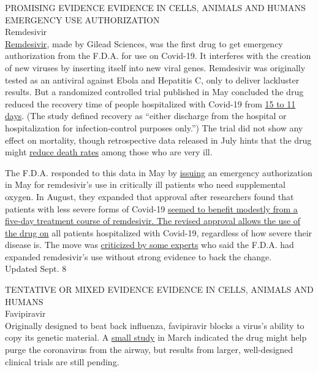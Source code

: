 PROMISING EVIDENCE EVIDENCE IN CELLS, ANIMALS AND HUMANS EMERGENCY USE
AUTHORIZATION\\
Remdesivir\\
\href{https://www.nytimes3xbfgragh.onion/2020/05/23/health/coronavirus-remdesivir.html}{Remdesivir},
made by Gilead Sciences, was the first drug to get emergency
authorization from the F.D.A. for use on Covid-19. It interferes with
the creation of new viruses by inserting itself into new viral genes.
Remdesivir was originally tested as an antiviral against Ebola and
Hepatitis C, only to deliver lackluster results. But a randomized
controlled trial published in May concluded the drug reduced the
recovery time of people hospitalized with Covid-19 from
\href{https://www.nejm.org/doi/full/10.1056/NEJMoa2007764}{15 to 11
days}. (The study defined recovery as ``either discharge from the
hospital or hospitalization for infection-control purposes only.'') The
trial did not show any effect on mortality, though retrospective data
released in July hints that the drug might
\href{https://www.gilead.com/news-and-press/press-room/press-releases/2020/7/gilead-presents-additional-data-on-investigational-antiviral-remdesivir-for-the-treatment-of-covid-19}{reduce
death rates} among those who are very ill.

The F.D.A. responded to this data in May by
\href{https://www.nytimes3xbfgragh.onion/2020/05/01/health/coronavirus-remdesivir.html}{issuing}
an emergency authorization in May for remdesivir's use in critically ill
patients who need supplemental oxygen. In August, they expanded that
approval after researchers found that patients with less severe forms of
Covid-19
\href{https://jamanetwork.com/journals/jama/fullarticle/2769871}{seemed
to benefit modestly from a five-day treatment course of remdesivir. The
revised approval allows the use of the drug on} all patients
hospitalized with Covid-19, regardless of how severe their disease is.
The move was
\href{https://www.usatoday.com/story/news/2020/08/28/fda-ignores-science-expanding-remdesivir-treat-covid-19/5662305002/}{criticized
by some experts} who said the F.D.A. had expanded remdesivir's use
without strong evidence to back the change.\\
Updated Sept. 8

TENTATIVE OR MIXED EVIDENCE EVIDENCE IN CELLS, ANIMALS AND HUMANS\\
Favipiravir\\
Originally designed to beat back influenza, favipiravir blocks a virus's
ability to copy its genetic material. A
\href{https://www.sciencedirect.com/science/article/pii/S2095809920300631?via\%3Dihub}{small
study} in March indicated the drug might help purge the coronavirus from
the airway, but results from larger, well-designed clinical trials are
still pending.

